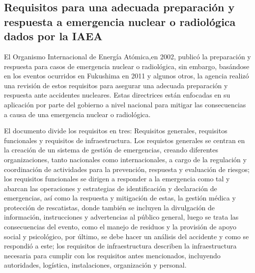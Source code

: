 \subsection{Requisitos para una adecuada preparación y respuesta a emergencia nuclear o radiológica dados por la IAEA}

El Organismo Internacional de Energía Atómica,en 2002, publicó la preparación y respuesta para casos de emergencia nuclear o radiológica, sin embargo, basándose en los eventos ocurridos en Fukushima en 2011 y algunos otros, la agencia realizó una revisión de estos requisitos para asegurar una adecuada preparación y respuesta ante accidentes nucleares. Estas directrices están enfocadas en su aplicación por parte del gobierno a nivel nacional para mitigar las consecuencias a causa de una emergencia nuclear o radiológica.

El documento divide los requisitos en tres: Requisitos generales, requisitos funcionales y requisitos de infraestructura. Los requistos generales se centran en la creación de un sistema de gestión de emergencias, creando diferentes organizaciones, tanto nacionales como internacionales, a cargo de la regulación y coordinación de actividades para la prevención, respuesta y evaluación de riesgos; los requisitos funcionales se dirigen a responder a la emergencia como tal y abarcan las operaciones y estrategias de identificación y declaración de emergencias, así como la respuesta y mitigación de estas, la gestión médica y protección de rescatistas, donde también se incluyen la divulgación de información, instrucciones y advertencias al público general, luego se trata las consecuencias del evento, como el manejo de residuos y la provisión de apoyo social y psicológico, por último, se debe hacer un análisis del accidente y como se respondió a este; los requisitos de infraestructura describen la infraestructura necesaria para cumplir con los requisitos antes mencionados, incluyendo autoridades, logística, instalaciones, organización y personal. \cite{IAEA2015Emergency}
